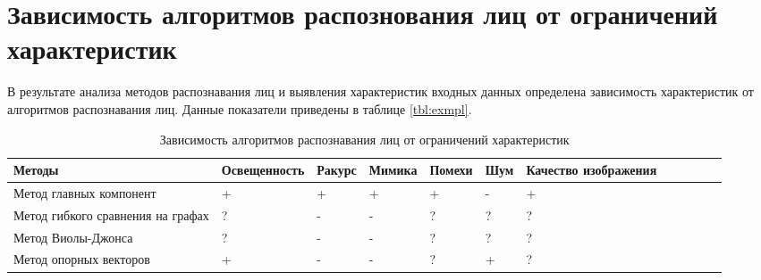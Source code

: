 \chapter{Зависимость алгоритмов распознования лиц от ограничений характеристик}

В результате анализа методов распознавания лиц и выявления характеристик 
входных данных определена зависимость характеристик от алгоритмов 
распознавания лиц. Данные показатели приведены в таблице \ref{tbl:exmpl}.

\begin{table}[!ht]
    \centering
    \caption{\label{tab:time}Зависимость алгоритмов распознавания лиц от ограничений характеристик}
    \begin{tabular}{|l|l|l|l|l|l|l|l|l|l|}
    \hline
        Методы & Освещенность & Ракурс & Мимика & Помехи & Шум  & Качество изображения & ~ & ~ & ~ \\ \hline
        Метод главных компонент & + & + & + & + & - & + & ~ & ~ & ~ \\ \hline
        Метод гибкого сравнения на графах & ? & - & - & ? & ? & ? & ~ & ~ & ~ \\ \hline
        Метод Виолы-Джонса & ? & - & - & ? & ? & ? & ~ & ~ & ~ \\ \hline
        Метод опорных векторов & + & - & - & ? & + & ? & ~ & ~ & ~ \\ \hline
    \end{tabular}
\end{table}

